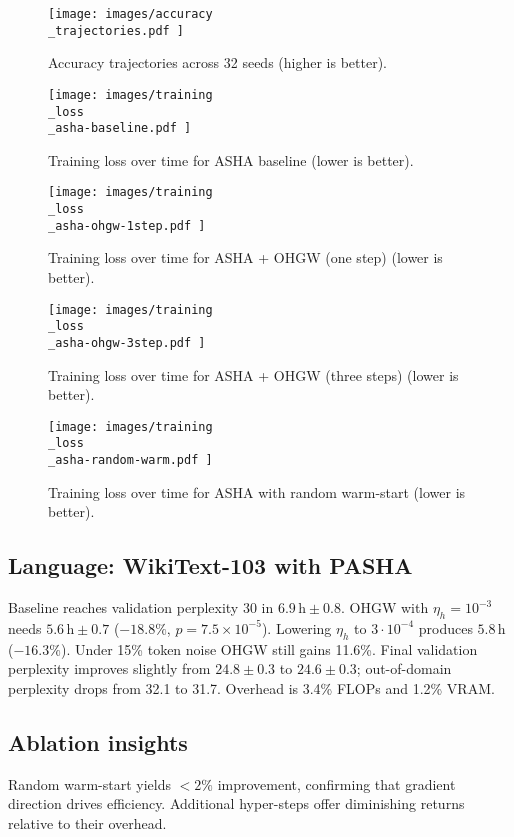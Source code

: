 \documentclass{article}
\begin{document}
\begin{figure}[H]
  \centering
  \texttt{[image:  images/accuracy\\\_trajectories.pdf ]}
  \caption{Accuracy trajectories across 32 seeds (higher is better).}
\end{figure}

\begin{figure}[H]
  \centering
  \texttt{[image:  images/training\\\_loss\\\_asha-baseline.pdf ]}
  \caption{Training loss over time for ASHA baseline (lower is better).}
\end{figure}

\begin{figure}[H]
  \centering
  \texttt{[image:  images/training\\\_loss\\\_asha-ohgw-1step.pdf ]}
  \caption{Training loss over time for ASHA + OHGW (one step) (lower is better).}
\end{figure}

\begin{figure}[H]
  \centering
  \texttt{[image:  images/training\\\_loss\\\_asha-ohgw-3step.pdf ]}
  \caption{Training loss over time for ASHA + OHGW (three steps) (lower is better).}
\end{figure}

\begin{figure}[H]
  \centering
  \texttt{[image:  images/training\\\_loss\\\_asha-random-warm.pdf ]}
  \caption{Training loss over time for ASHA with random warm-start (lower is better).}
\end{figure}

\subsection{Language: WikiText-103 with PASHA}
Baseline reaches validation perplexity 30 in \(6.9\,\text{h} \pm 0.8\). OHGW with \(\eta_h = 10^{-3}\) needs \(5.6\,\text{h} \pm 0.7\) (\(-18.8\%\), \(p = 7.5 \times 10^{-5}\)). Lowering \(\eta_h\) to \(3\cdot10^{-4}\) produces \(5.8\,\text{h}\) (\(-16.3\%\)). Under 15\% token noise OHGW still gains 11.6\%. Final validation perplexity improves slightly from \(24.8 \pm 0.3\) to \(24.6 \pm 0.3\); out-of-domain perplexity drops from 32.1 to 31.7. Overhead is 3.4\% FLOPs and 1.2\% VRAM.

\subsection{Ablation insights}
Random warm-start yields \(<2\%\) improvement, confirming that gradient direction drives efficiency. Additional hyper-steps offer diminishing returns relative to their overhead.
\end{document}
